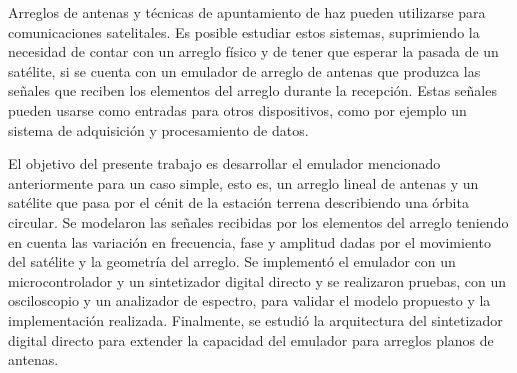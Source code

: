 \documentclass[class=article, crop=false]{standalone}
\begin{document}
Arreglos de antenas y técnicas de apuntamiento de haz pueden utilizarse para comunicaciones satelitales.
Es posible estudiar estos sistemas, suprimiendo la necesidad de contar con un arreglo físico y de tener que esperar la pasada de un satélite, si se cuenta con un emulador de arreglo de antenas que produzca las señales que reciben los elementos del arreglo durante la recepción.
Estas señales pueden usarse como entradas para otros dispositivos, como por ejemplo un sistema de adquisición y procesamiento de datos.

El objetivo del presente trabajo es desarrollar el emulador mencionado anteriormente para un caso simple, esto es, un arreglo lineal de antenas y un satélite que pasa por el cénit de la estación terrena describiendo una órbita circular.
Se modelaron las señales recibidas por los elementos del arreglo teniendo en cuenta las variación en frecuencia, fase y amplitud dadas por el movimiento del satélite y la geometría del arreglo.
Se implementó el emulador con un microcontrolador y un sintetizador digital directo y se realizaron pruebas, con un osciloscopio y un analizador de espectro, para validar el modelo propuesto y la implementación realizada.
Finalmente, se estudió la arquitectura del sintetizador digital directo para extender la capacidad del emulador para arreglos planos de antenas.
\end{document}
